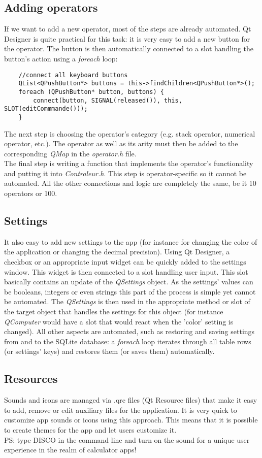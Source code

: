 \documentclass[titlepage]{article}
\begin{document}
	\subsection{Adding operators}
	If we want to add a new operator, most of the steps are already automated. Qt Designer is quite practical for this task: it is very easy to add a new button for the operator. The button is then automatically connected to a slot handling the button's action using a \textit{foreach} loop: 
	\begin{lstlisting}
    //connect all keyboard buttons
    QList<QPushButton*> buttons = this->findChildren<QPushButton*>();
    foreach (QPushButton* button, buttons) {
        connect(button, SIGNAL(released()), this, SLOT(editCommmande()));
    }
	\end{lstlisting}
	The next step is choosing the operator's category (e.g. stack operator, numerical operator, etc.). The operator as well as its arity must then be added to the corresponding \textit{QMap} in the \textit{operator.h} file. \\
	The final step is writing a function that implements the operator's functionality and putting it into \textit{Controleur.h}. This step is operator-specific so it cannot be automated. All the other connections and logic are completely the same, be it 10 operators or 100.

	\subsection{Settings}
	It also easy to add new settings to the app (for instance for changing the color of the application or changing the decimal precision). Using Qt Designer, a checkbox or an appropriate input widget can be quickly added to the settings window. This widget is then connected to a slot handling user input. This slot basically contains an update of the \textit{QSettings} object. As the settings' values can be booleans, integers or even strings this part of the process is simple yet cannot be automated. The \textit{QSettings} is then used in the appropriate method or slot of the target object that handles the settings for this object (for instance \textit{QComputer} would have a slot that would react when the 'color' setting is changed). All other aspects are automated, such as restoring and saving settings from and to the SQLite database: a \textit{foreach} loop iterates through all table rows (or settings' keys) and restores them (or saves them) automatically.
	
	\subsection{Resources}
	Sounds and icons are managed via .qrc files (Qt Resource files) that make it easy to add, remove or edit auxiliary files for the application. It is very quick to customize app sounds or icons using this approach. This means that it is possible to create themes for the app and let users customize it.\\

	{\scriptsize PS: type DISCO in the command line and turn on the sound for a unique user experience in the realm of calculator apps!}
\end{document}
